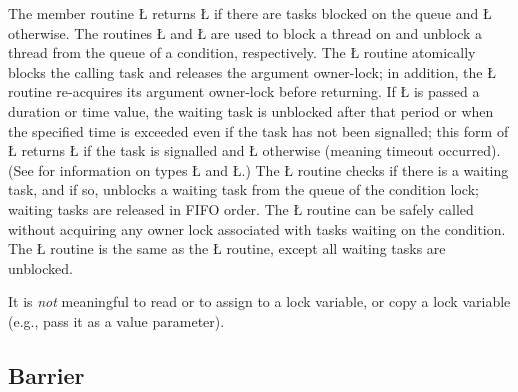 \documentclass[openright,twoside]{report}
\begin{document}
The member routine \LGinlinetrue\LGbegin\lgrinde\L{}\endlgrinde\LGend{} returns \LGinlinetrue\LGbegin\lgrinde\L{}\endlgrinde\LGend{} if there are tasks blocked on the queue and \LGinlinetrue\LGbegin\lgrinde\L{}\endlgrinde\LGend{} otherwise.
The routines \LGinlinetrue\LGbegin\lgrinde\L{}\endlgrinde\LGend{} and \LGinlinetrue\LGbegin\lgrinde\L{}\endlgrinde\LGend{} are used to block a thread on and unblock a thread from the queue of a condition, respectively.
The \LGinlinetrue\LGbegin\lgrinde\L{}\endlgrinde\LGend{} routine atomically blocks the calling task and releases the argument owner-lock;
in addition, the \LGinlinetrue\LGbegin\lgrinde\L{}\endlgrinde\LGend{} routine re-acquires its argument owner-lock before returning.
If \LGinlinetrue\LGbegin\lgrinde\L{}\endlgrinde\LGend{} is passed a duration or time value, the waiting task is unblocked after that period or when the specified time is exceeded even if the task has not been signalled;
this form of \LGinlinetrue\LGbegin\lgrinde\L{}\endlgrinde\LGend{} returns \LGinlinetrue\LGbegin\lgrinde\L{}\endlgrinde\LGend{} if the task is signalled and \LGinlinetrue\LGbegin\lgrinde\L{}\endlgrinde\LGend{} otherwise (meaning timeout occurred).
(See  for information on types \LGinlinetrue\LGbegin\lgrinde\L{}\endlgrinde\LGend{} and \LGinlinetrue\LGbegin\lgrinde\L{}\endlgrinde\LGend{}.)
The \LGinlinetrue\LGbegin\lgrinde\L{}\endlgrinde\LGend{} routine checks if there is a waiting task, and if so, unblocks a waiting task from the queue of the condition lock;
waiting tasks are released in FIFO order.
The \LGinlinetrue\LGbegin\lgrinde\L{}\endlgrinde\LGend{} routine can be safely called without acquiring any owner lock associated with tasks waiting on the condition.
The \LGinlinetrue\LGbegin\lgrinde\L{}\endlgrinde\LGend{} routine is the same as the \LGinlinetrue\LGbegin\lgrinde\L{}\endlgrinde\LGend{} routine, except all waiting tasks are unblocked.

It is \emph{not} meaningful to read or to assign to a lock variable, or copy a lock variable (e.g., pass it as a value parameter).


\subsection{Barrier}
\end{document}
